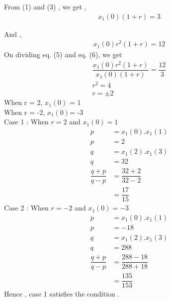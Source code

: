 \documentclass[journal,12pt,twocolumn]{IEEEtran}
\theoremstyle{remark}
\begin{document}
From (1) and (3) , we get , 
\begin{align}
x_1(0)(1+r)=3
\end{align}
 
 And ,
 \begin{align}
x_1(0)r^{2}(1+r) = 12
\end{align}
On dividing eq. (5) and eq. (6), we get
\begin{align}
\dfrac{x_1(0)r^{2}(1+r)}{x_1(0)(1+r)} = \dfrac{12}{3} \\
r^{2} = 4 \\
r = \pm2
\end{align}
When r = 2, $x_1(0)$ = 1 \\
When r = -2, $x_1(0)$= -3 \\
Case 1 :
When $r = 2$ and $x_1(0) = 1$ \\
\begin{align}
p &=  x_1(0).x_1(1)\\
p&=2 \\
q&=  x_1(2).x_1(3) \\
q&=32 \\
\dfrac{q+p}{q-p} &= \dfrac{32 + 2}{32 - 2} \\
&=\dfrac{17}{15}
\end{align}
Case 2 :
When $r = -2$ and $x_1(0) = -3$ \\
\begin{align}
p &= x_1(0).x_1(1)\\
p&=-18 \\
q&= x_1(2).x_1(3) \\
q&=288 \\
\dfrac{q+p}{q-p} &= \dfrac{288-18}{288+18} \\
&=\dfrac{135}{153}
\end{align}
Hence , case 1 satisfies the condition .
\end{document}
